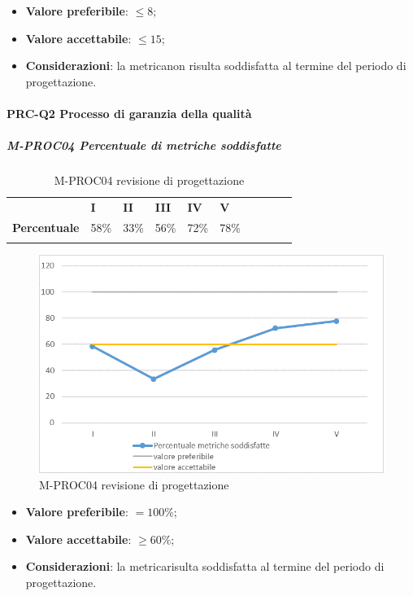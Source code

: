 \begin{itemize}
	\item \textbf{Valore preferibile}: $\le8$;
	\item \textbf{Valore accettabile}: $\le15$;
	\item \textbf{Considerazioni}: la metrica\glosp non risulta soddisfatta al termine del periodo di progettazione\glo.
\end{itemize}

\paragraph*{PRC-Q2 Processo di garanzia della qualità}
\subparagraph{M-PROC04 Percentuale di metriche soddisfatte} \mbox{}
\begin{longtable}[H!] {						
		>{}p{50mm}  		
		>{}p{8mm}
		>{}p{8mm}		
		>{}p{8mm}		
		>{}p{8mm}		
		>{}p{8mm}		
		>{}p{8mm}
		>{}p{8mm}
		>{}p{8mm}
		>{}p{8mm}
	}
	\rowcolor{gray!50}
	\textbf{} & \textbf{I} & \textbf{II} & \textbf{III} & \textbf{IV} & \textbf{V} \TBstrut \\ [2mm]
	\textbf{Percentuale} & 58\% & 33\% & 56\% & 72\% & 78\% \TBstrut \\ [2mm]
	\rowcolor{white}
	\caption{M-PROC04 revisione di progettazione\glo}
\end{longtable}
\begin{figure}[H] 	
	\includegraphics[width=\linewidth]{./img/grafici/RP19.png}	
	\caption{M-PROC04 revisione di progettazione\glo}	
\end{figure}
\begin{itemize}
	\item \textbf{Valore preferibile}: $=100\%$;
	\item \textbf{Valore accettabile}: $\ge60\%$;
	\item \textbf{Considerazioni}: la metrica\glosp risulta soddisfatta al termine del periodo di progettazione\glo.
\end{itemize}
